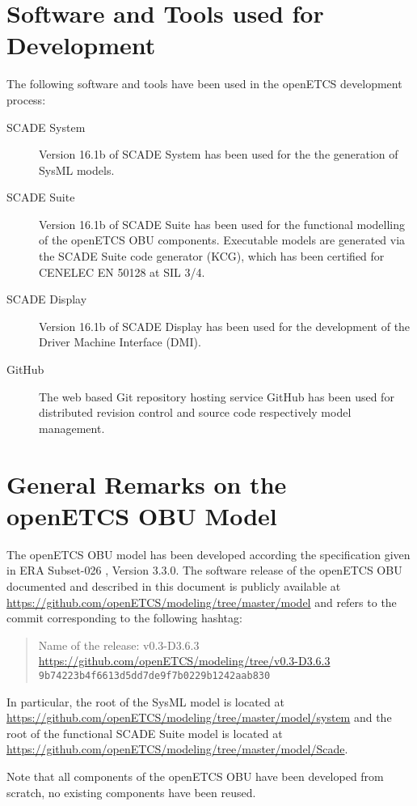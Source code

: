 \section{Software and Tools used for Development}

The following software and tools have been used in the openETCS development process:
\begin{description}
\item[SCADE System] Version 16.1b of SCADE System has been used for the the generation of SysML models.
\item[SCADE Suite] Version 16.1b of SCADE Suite has been used for the functional modelling of the openETCS OBU components. Executable models are generated via the SCADE Suite code generator (KCG), which has been certified for CENELEC EN 50128 at SIL 3/4.
\item[SCADE Display] Version 16.1b of SCADE Display has been used for the development of the Driver Machine Interface (DMI).
\item[GitHub] The web based Git repository hosting service GitHub has been used for distributed revision control and source code respectively model management.
\end{description}


\section{General Remarks on the openETCS OBU Model}
The openETCS OBU model has been developed according the specification given in ERA Subset-026 \cite{subset-026}, Version 3.3.0. The software release of the openETCS OBU documented and described in this document is publicly available at \url{https://github.com/openETCS/modeling/tree/master/model} and refers to the commit corresponding to the following hashtag:
\begin{quotation}
\centering
Name of the release: v0.3-D3.6.3\\

\url{https://github.com/openETCS/modeling/tree/v0.3-D3.6.3}
\texttt{9b74223b4f6613d5dd7de9f7b0229b1242aab830}
\end{quotation}
In particular, the root of the SysML model is located at
\url{https://github.com/openETCS/modeling/tree/master/model/system}
and the root of the functional SCADE Suite model is located at
\url{https://github.com/openETCS/modeling/tree/master/model/Scade}.

Note that all components of the openETCS OBU have been developed from scratch, no existing components have been reused.